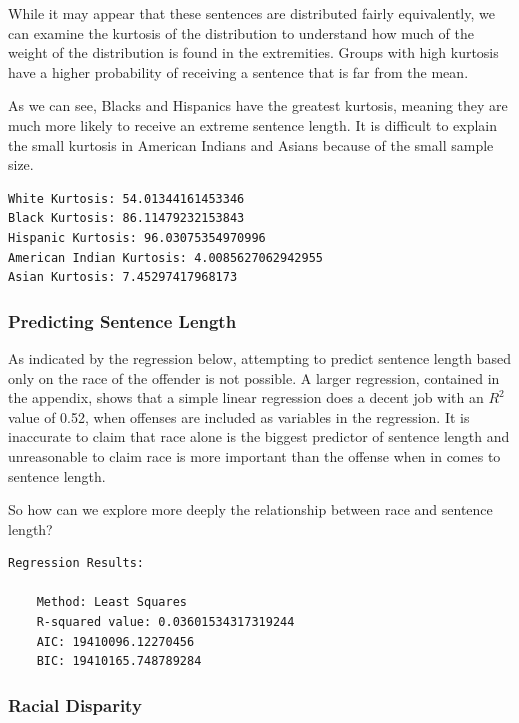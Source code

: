 \documentclass[11pt]{article}
\begin{document}
    While it may appear that these sentences are distributed fairly
equivalently, we can examine the kurtosis of the distribution to
understand how much of the weight of the distribution is found in the
extremities. Groups with high kurtosis have a higher probability of
receiving a sentence that is far from the mean\cite{kurt}.

As we can see, Blacks and Hispanics have the greatest kurtosis, meaning
they are much more likely to receive an extreme sentence length. It is
difficult to explain the small kurtosis in American Indians and Asians
because of the small sample size.

    \begin{Verbatim}[commandchars=\\\{\}]
White Kurtosis: 54.01344161453346
Black Kurtosis: 86.11479232153843
Hispanic Kurtosis: 96.03075354970996
American Indian Kurtosis: 4.0085627062942955
Asian Kurtosis: 7.45297417968173

    \end{Verbatim}

    \hypertarget{predicting-sentence-length}{%
\subsubsection{Predicting Sentence
Length}\label{predicting-sentence-length}}

As indicated by the regression below, attempting to predict sentence
length based only on the race of the offender is not possible. A larger
regression, contained in the appendix, shows that a simple linear
regression does a decent job with an \(R^2\) value of 0.52, when
offenses are included as variables in the regression. It is inaccurate
to claim that race alone is the biggest predictor of sentence length and
unreasonable to claim race is more important than the offense when in
comes to sentence length.

So how can we explore more deeply the relationship between race and
sentence length?

    \begin{Verbatim}[commandchars=\\\{\}]
Regression Results:

	Method: Least Squares
	R-squared value: 0.03601534317319244
	AIC: 19410096.12270456
	BIC: 19410165.748789284

    \end{Verbatim}

    \hypertarget{racial-disparity}{%
\subsubsection{Racial Disparity}\label{racial-disparity}}
\end{document}
